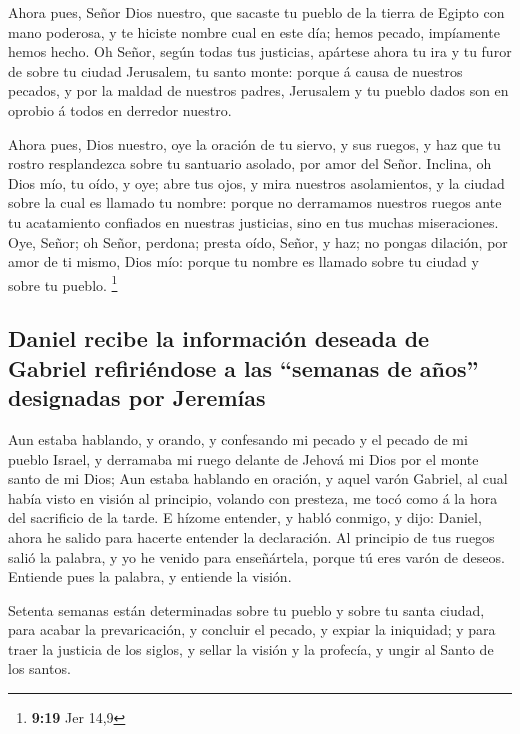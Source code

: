  Ahora pues, Señor Dios nuestro, que sacaste tu pueblo de
la tierra de Egipto con mano poderosa, y te hiciste nombre cual en este
día; hemos pecado, impíamente hemos hecho.  Oh Señor, según
todas tus justicias, apártese ahora tu ira y tu furor de sobre tu ciudad
Jerusalem, tu santo monte: porque á causa de nuestros pecados, y por la
maldad de nuestros padres, Jerusalem y tu pueblo dados son en oprobio á
todos en derredor nuestro.

 Ahora pues, Dios nuestro, oye la oración de tu siervo, y
sus ruegos, y haz que tu rostro resplandezca sobre tu santuario asolado,
por amor del Señor.  Inclina, oh Dios mío, tu oído, y oye;
abre tus ojos, y mira nuestros asolamientos, y la ciudad sobre la cual
es llamado tu nombre: porque no derramamos nuestros ruegos ante tu
acatamiento confiados en nuestras justicias, sino en tus muchas
miseraciones.  Oye, Señor; oh Señor, perdona; presta oído,
Señor, y haz; no pongas dilación, por amor de ti mismo, Dios mío: porque
tu nombre es llamado sobre tu ciudad y sobre tu pueblo. \footnote{\textbf{9:19}
  Jer 14,9}

\hypertarget{daniel-recibe-la-informaciuxf3n-deseada-de-gabriel-refiriuxe9ndose-a-las-semanas-de-auxf1os-designadas-por-jeremuxedas}{%
\subsection{Daniel recibe la información deseada de Gabriel refiriéndose
a las ``semanas de años'' designadas por
Jeremías}\label{daniel-recibe-la-informaciuxf3n-deseada-de-gabriel-refiriuxe9ndose-a-las-semanas-de-auxf1os-designadas-por-jeremuxedas}}

 Aun estaba hablando, y orando, y confesando mi pecado y el
pecado de mi pueblo Israel, y derramaba mi ruego delante de Jehová mi
Dios por el monte santo de mi Dios;  Aun estaba hablando en
oración, y aquel varón Gabriel, al cual había visto en visión al
principio, volando con presteza, me tocó como á la hora del sacrificio
de la tarde.  E hízome entender, y habló conmigo, y dijo:
Daniel, ahora he salido para hacerte entender la declaración.
 Al principio de tus ruegos salió la palabra, y yo he
venido para enseñártela, porque tú eres varón de deseos. Entiende pues
la palabra, y entiende la visión.

 Setenta semanas están determinadas sobre tu pueblo y sobre
tu santa ciudad, para acabar la prevaricación, y concluir el pecado, y
expiar la iniquidad; y para traer la justicia de los siglos, y sellar la
visión y la profecía, y ungir al Santo de los santos.


